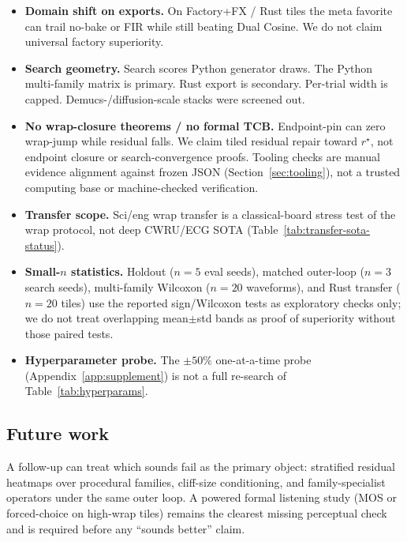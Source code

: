 \begin{itemize}
    Latency timings in Appendix~\ref{app:supplement} still use the wavetable checkpoint zero-shot.
    Cycle-GAN / BeatDiff / real KIT--PMU remain incomplete where noted
    (Table~\ref{tab:transfer-sota-status}).
  \item \textbf{Domain shift on exports.}
    On Factory+FX / Rust tiles the meta favorite can trail no-bake or FIR while still beating Dual Cosine.
    We do not claim universal factory superiority.
  \item \textbf{Search geometry.}
    Search scores Python generator draws.
    The Python multi-family matrix is primary. Rust export is secondary.
    Per-trial width is capped. Demucs-/diffusion-scale stacks were screened out.
  \item \textbf{No wrap-closure theorems / no formal TCB.}
    Endpoint-pin can zero wrap-jump while residual falls.
    We claim tiled residual repair toward $r^{\star}$, not endpoint closure or search-convergence proofs.
    Tooling checks are manual evidence alignment against frozen JSON (Section~\ref{sec:tooling}), not a trusted computing base or machine-checked verification.
  \item \textbf{Transfer scope.}
    Sci/eng wrap transfer is a classical-board stress test of the wrap protocol, not deep CWRU/ECG SOTA
    (Table~\ref{tab:transfer-sota-status}).
  \item \textbf{Small-$n$ statistics.}
    Holdout ($n{=}5$ eval seeds), matched outer-loop ($n{=}3$ search seeds), multi-family Wilcoxon ($n{=}20$ waveforms), and Rust transfer ($n{=}20$ tiles) use the reported sign/Wilcoxon tests as exploratory checks only; we do not treat overlapping mean$\pm$std bands as proof of superiority without those paired tests.
  \item \textbf{Hyperparameter probe.}
    The $\pm 50\%$ one-at-a-time probe (Appendix~\ref{app:supplement}) is not a full re-search of Table~\ref{tab:hyperparams}.
\end{itemize}

\subsection{Future work}
\label{sec:outlook}

A follow-up can treat which sounds fail as the primary object: stratified residual heatmaps over procedural families, cliff-size conditioning, and family-specialist operators under the same outer loop.
A powered formal listening study (MOS or forced-choice on high-wrap tiles) remains the clearest missing perceptual check and is required before any ``sounds better'' claim.
